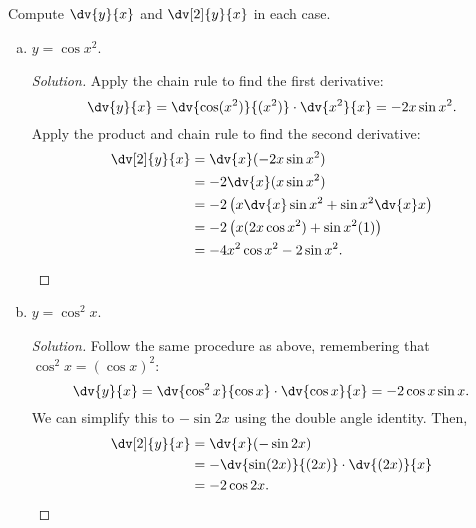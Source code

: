 \question Compute $\displaystyle\dv{y}{x}$ and $\displaystyle\dv[2]{y}{x}$ in each case.
\begin{enumerate}[(a)]
  \item $y=\cos x^2$.
        \begin{proof}[Solution]
          Apply the chain rule to find the first derivative:
          \[ \dv{y}{x} = \dv{\cos(x^2)}{(x^2)} \cdot \dv{x^2}{x} = -2x\sin x^2. \]
          Apply the product and chain rule to find the second derivative:
          \begin{align*}
            \dv[2]{y}{x} & = \dv{x}(-2x\sin x^2)                                \\
                         & = -2\dv{x}(x\sin x^2)                                \\
                         & = -2\left( x\dv{x}\sin x^2 + \sin x^2\dv{x}x \right) \\
                         & = -2\left( x(2x\cos x^2) + \sin x^2(1) \right)       \\
                         & = -4x^2\cos x^2 - 2\sin x^2. \qedhere
          \end{align*}
        \end{proof}
  \item $y=\cos^2 x$.
        \begin{proof}[Solution]
          Follow the same procedure as above, remembering that $\cos^2 x = (\cos x)^2$:
          \[ \dv{y}{x} = \dv{\cos^2 x}{\cos x}\cdot\dv{\cos x}{x} = -2\cos x\sin x. \]
          We can simplify this to $-\sin 2x$ using the double angle identity. Then,
          \begin{align*}
            \dv[2]{y}{x} & = \dv{x}(-\sin 2x)                      \\
                         & = -\dv{\sin(2x)}{(2x)}\cdot\dv{(2x)}{x} \\
                         & = -2\cos 2x. \qedhere
          \end{align*}
        \end{proof}
\end{enumerate}


